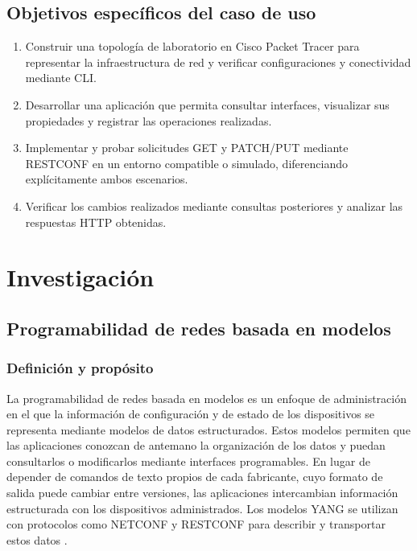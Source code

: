 \subsection{Objetivos específicos del caso de uso}
\begin{enumerate}[label=\arabic*.]
  \item Construir una topología de laboratorio en Cisco Packet Tracer para representar la infraestructura de red y verificar configuraciones y conectividad mediante CLI.
  \item Desarrollar una aplicación que permita consultar interfaces, visualizar sus propiedades y registrar las operaciones realizadas.
  \item Implementar y probar solicitudes GET y PATCH/PUT mediante RESTCONF en un entorno compatible o simulado, diferenciando explícitamente ambos escenarios.
  \item Verificar los cambios realizados mediante consultas posteriores y analizar las respuestas HTTP obtenidas.
\end{enumerate}

\section{Investigación}

\subsection{Programabilidad de redes basada en modelos}

\subsubsection{Definición y propósito}
La programabilidad de redes basada en modelos es un enfoque de administración en el que la información de configuración y de estado de los dispositivos se representa mediante modelos de datos estructurados. Estos modelos permiten que las aplicaciones conozcan de antemano la organización de los datos y puedan consultarlos o modificarlos mediante interfaces programables. En lugar de depender de comandos de texto propios de cada fabricante, cuyo formato de salida puede cambiar entre versiones, las aplicaciones intercambian información estructurada con los dispositivos administrados. Los modelos YANG se utilizan con protocolos como NETCONF y RESTCONF para describir y transportar estos datos \parencite{rfc7950,rfc6241,rfc8040}.

